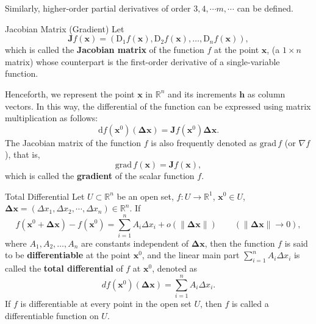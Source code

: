 \documentclass[11pt]{elegantbook}
\begin{document}
Similarly, higher-order partial derivatives of order \(3,4,\cdots m,\cdots\) can be defined.

\begin{definition}{Jacobian Matrix (Gradient)}
    Let
    \[
    \boldsymbol{J}f(\boldsymbol{x}) = (\mathrm{D}_1 f(\boldsymbol{x}), \mathrm{D}_2 f(\boldsymbol{x}), \dots, \mathrm{D}_n f(\boldsymbol{x})),
    \]
    which is called the \textbf{Jacobian matrix} of the function \( f \) at the point \( \boldsymbol{x} \), 
    (a \( 1 \times n \) matrix) whose counterpart is the first-order derivative of a single-variable function.

    Henceforth, we represent the point \(\boldsymbol{x}\) in \( \mathbb{R}^n \) 
    and its increments \(\boldsymbol{h}\) as column vectors.
    In this way, the differential of the function can be expressed using matrix multiplication as follows:
    \[
    \mathrm{d}f(\boldsymbol{x}^{0})(\boldsymbol{\Delta x}) = \boldsymbol{J}f(\boldsymbol{x}^{0}) \boldsymbol{\Delta x}.
    \]
    The Jacobian matrix of the function \( f \) is also frequently denoted as 
    \(\boldsymbol{\mathrm{grad}}\,f\) (or \(\nabla f\)), that is,
    \[
    \boldsymbol{\mathrm{grad}}\,f(\boldsymbol{x}) = \boldsymbol{J}f(\boldsymbol{x}),
    \]
    which is called the \textbf{gradient} of the scalar function \( f \).
\end{definition}


\begin{definition}{Total Differential}
    Let \(U\subset \mathbb{R}^n\) be an open set, \(f: U\to \mathbb{R}^{1}\), \(\boldsymbol{x}^{0}\in U\),
    \(\boldsymbol{\Delta x}=\left( \Delta x_{1},\Delta x_{2},\cdots,\Delta x_{n} \right) \in \mathbb{R}^{n}\). If
    \[
    f(\boldsymbol{x}^{0} + \boldsymbol{\Delta x}) - f(\boldsymbol{x}^{0}) = 
    \sum_{i=1}^n A_{i} \Delta x_{i} + o(\|\boldsymbol{\Delta x}\|) \qquad (\|\boldsymbol{\Delta x}\| \to 0),
    \]
    where \(A_{1}, A_{2}, \dots, A_{n}\) are constants independent of \(\boldsymbol{\Delta x}\), 
    then the function \(f\) is said to be \textbf{differentiable} at the point \(\boldsymbol{x}^{0}\), 
    and the linear main part \(\sum_{i=1}^n A_{i} \Delta x_{i}\) is called the \textbf{total differential} 
    of \(f\) at \(\boldsymbol{x}^{0}\), 
    denoted as
    \[
    df(\boldsymbol{x}^{0})(\boldsymbol{\Delta x}) = \sum_{i=1}^n A_{i} \Delta x_{i}.
    \]
    If \(f\) is differentiable at every point in the open set \(U\), 
    then \(f\) is called a differentiable function on \(U\).    
\end{definition}
\end{document}
